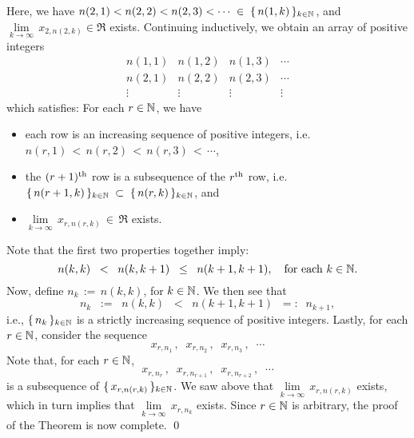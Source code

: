 Here, we have $n(2,1) < n(2,2) < n(2,3) < \cdots \;\in\;\{\,n(1,k)\,\}_{k\in\mathbb{N}}$, and
$\underset{k\rightarrow\infty}{\lim}\,x_{2,n(2,k)} \in \Re$ exists.
Continuing inductively, we obtain an array of positive integers
\begin{equation*}
\begin{array}{cccc}
n(1,1) & n(1,2) & n(1,3) & \cdots \\
n(2,1) & n(2,2) & n(2,3) & \cdots \\
\vdots & \vdots & \vdots & \vdots  
\end{array}
\end{equation*}
which satisfies: For each $r \in \mathbb{N}$, we have
\begin{itemize}
\item	each row is an increasing sequence of positive integers, i.e. $n(r,1) \,<\, n(r,2) \,<\, n(r,3) \,<\, \cdots$,
\item	the $(r+1)^{\textnormal{th}}$ row is a subsequence of the $r^{\textnormal{th}}$ row, i.e.
		$\{\,n(r+1,k)\,\}_{k\in\mathbb{N}} \;\subset\; \{\,n(r,k)\,\}_{k\in\mathbb{N}}$,
		and
\item	$\underset{k\rightarrow\infty}{\lim}\,x_{r,n(r,k)} \,\in\, \Re$ exists.
\end{itemize}
Note that the first two properties together imply:
\begin{equation*}
n(k,k) \;\;<\;\; n(k,k+1) \;\;\leq\;\; n(k+1,k+1),
\quad
\textnormal{for each $k \in \mathbb{N}$}.
\end{equation*} 
Now, define $n_{k} \,:=\, n(k,k)$, for $k \in \mathbb{N}$.
We then see that
\begin{equation*}
n_{k} \;\; := \;\; n(k,k) \;\; < \;\; n(k+1,k+1) \;\; =: \;\; n_{k+1},
\end{equation*}
i.e., $\{\,n_{k}\,\}_{k\in\mathbb{N}}$ is a strictly increasing sequence of positive integers.
Lastly, for each $r \in \mathbb{N}$, consider the sequence
\begin{equation*}
x_{r,n_{1}}\,,\;\;
x_{r,n_{2}}\,,\;\;
x_{r,n_{3}}\,,\;\;
\cdots
\end{equation*}
Note that, for each $r \in \mathbb{N}$,
\begin{equation*}
x_{r,n_{r}}\,,\;\;
x_{r,n_{r+1}}\,,\;\;
x_{r,n_{r+2}}\,,\;\;
\cdots
\end{equation*}
is a subsequence of $\{\,x_{r,n(r,k)}\,\}_{k\in\mathbb{N}}$.
We saw above that $\underset{k\rightarrow\infty}{\lim}\,x_{r,n(r,k)}$ exists,
which in turn implies that $\underset{k\rightarrow\infty}{\lim}\,x_{r,n_{k}}$ exists.
Since $r \in \mathbb{N}$ is arbitrary, the proof of the Theorem is now complete.
\qed


\renewcommand{\theenumi}{\roman{enumi}}
\renewcommand{\labelenumi}{\textnormal{(\theenumi)}$\;\;$}

